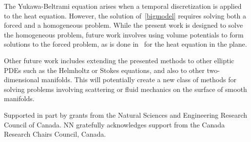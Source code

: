 The Yukawa-Beltrami equation arises when a temporal discretization is
applied to the heat equation.  However, the solution of~\eqref{bigmodel}
requires solving both a forced and a homogeneous problem.  While the
present work is designed to solve the homogeneous problem, future work
involves using volume potentials to form solutions to the forced
problem, as is done in~\cite{rothe:heat} for the heat equation in the
plane.

Other future work includes extending the presented methods to other
elliptic PDEs such as the Helmholtz or Stokes equations, and also to
other two-dimensional manifolds.  This will potentially create a new
class of methods for solving problems involving scattering or fluid
mechanics on the surface of smooth manifolds.

\begin{acknowledgements}
Supported in part by grants from the Natural Sciences and Engineering
Research Council of Canada. NN gratefully acknowledges support from the
Canada Research Chairs Council, Canada.
\end{acknowledgements}







